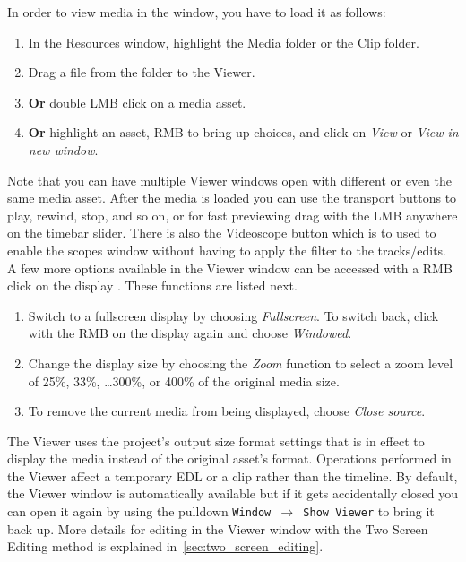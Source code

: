 In order to view media in the window, you have to load it as follows:

\begin{enumerate}
    \item  In the Resources window, highlight the Media folder or the Clip folder.
    \item  Drag a file from the folder to the Viewer.
    \item  \textbf{Or} double LMB click on a media asset.
    \item  \textbf{Or} highlight an asset, RMB to bring up choices, and click on \textit{View} or
\textit{View in new window}.
\end{enumerate}

Note that you can have multiple Viewer windows open with different or even the same media asset.
After the media is loaded you can use the transport buttons to play, rewind, stop, and so on, or
for fast previewing drag with the LMB anywhere on the timebar slider.  There is also the Videoscope 
button which is to used to enable the scopes window without having to apply the filter to the tracks/edits.
A few more options available in the Viewer window can be accessed with a RMB click on the display .
These functions are listed next.

\begin{enumerate}
    \item  Switch to a fullscreen display by choosing \textit{Fullscreen}.  To switch back, click
with the RMB on the display again and choose \textit{Windowed}.
    \item  Change the display size by choosing the \textit{Zoom} function to select a zoom level of
25\%, 33\%, \ldots 300\%, or 400\% of the original media size.
    \item  To remove the current media from being displayed, choose \textit{Close source}.
\end{enumerate}

The Viewer uses the project's output size format settings that is in effect to display the media instead of the
original asset's format. Operations performed in the Viewer affect a temporary EDL or a clip rather
than the timeline.  By default, the Viewer window is automatically available but if it gets
accidentally closed you can open it again by using the pulldown \texttt{Window $\rightarrow$ Show
Viewer} to bring it back up.  More details for editing in the Viewer window with the Two Screen
Editing method is explained in~\ref{sec:two_screen_editing}.


